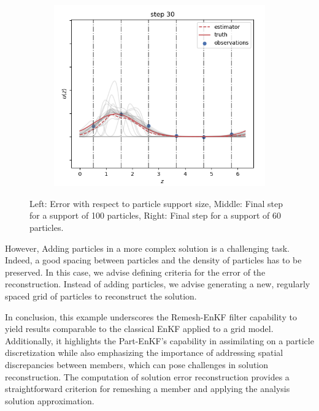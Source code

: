 \begin{figure}
\begin{subfigure}{0.29\textwidth}
		\includegraphics[width=\textwidth]{images/app1d/error_support/not_ok.png}
		\label{error_support3}
	\end{subfigure}
	\caption{Left: Error with respect to particle support size, Middle: Final step for a support of 100 particles, Right: Final step for a support of 60 particles.}
	\label{error_support}
\end{figure}
However, Adding particles in a more complex solution is a challenging task. Indeed, a good spacing between particles and the density of particles has to be preserved. In this case, we advise defining criteria for the error of the reconstruction. Instead of adding particles, we advise generating a new, regularly spaced grid of particles to reconstruct the solution.

In conclusion, this example underscores the Remesh-EnKF filter capability to yield results comparable to the classical EnKF applied to a grid model. Additionally, it highlights the Part-EnKF's capability in assimilating on a particle discretization while also emphasizing the importance of addressing spatial discrepancies between members, which can pose challenges in solution reconstruction. The computation of solution error reconstruction provides a straightforward criterion for remeshing a member and applying the analysis solution approximation.


\newpage
